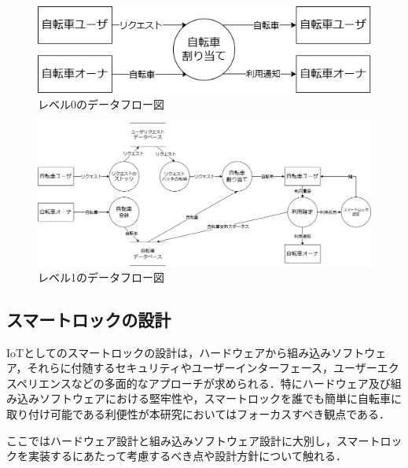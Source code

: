          \begin{figure}[htbp]
            \centering
            \includegraphics[scale=0.4]
            {figures/dfd-level0.drawio.png}
            \caption{レベル0のデータフロー図}
            \label{fig:レベル0のデータフロー図}
          \end{figure}

          \begin{figure}[htbp]
            \centering
            \includegraphics[scale=0.4]
            {figures/dfd-level1.drawio.png}
            \caption{レベル1のデータフロー図}
            \label{fig:レベル1のデータフロー図}
          \end{figure}

  \subsection{スマートロックの設計}
    \label{sec:スマートロックの設計}
      \par IoTとしてのスマートロックの設計は，ハードウェアから組み込みソフトウェア，それらに付随するセキュリティやユーザーインターフェース，ユーザーエクスペリエンスなどの多面的なアプローチが求められる．特にハードウェア及び組み込みソフトウェアにおける堅牢性や，スマートロックを誰でも簡単に自転車に取り付け可能である利便性が本研究においてはフォーカスすべき観点である．
      \par ここではハードウェア設計と組み込みソフトウェア設計に大別し，スマートロックを実装するにあたって考慮するべき点や設計方針について触れる．
      
